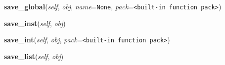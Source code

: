     \label{pickle:Pickler:save_global}

    \vspace{0.5ex}

\hspace{.8\funcindent}\begin{boxedminipage}{\funcwidth}

    \raggedright \textbf{save\_global}(\textit{self}, \textit{obj}, \textit{name}={\tt None}, \textit{pack}={\tt {\textless}built-in function pack{\textgreater}})

\setlength{\parskip}{2ex}
\setlength{\parskip}{1ex}
    \end{boxedminipage}

    \label{pickle:Pickler:save_inst}

    \vspace{0.5ex}

\hspace{.8\funcindent}\begin{boxedminipage}{\funcwidth}

    \raggedright \textbf{save\_inst}(\textit{self}, \textit{obj})

\setlength{\parskip}{2ex}
\setlength{\parskip}{1ex}
    \end{boxedminipage}

    \label{pickle:Pickler:save_int}

    \vspace{0.5ex}

\hspace{.8\funcindent}\begin{boxedminipage}{\funcwidth}

    \raggedright \textbf{save\_int}(\textit{self}, \textit{obj}, \textit{pack}={\tt {\textless}built-in function pack{\textgreater}})

\setlength{\parskip}{2ex}
\setlength{\parskip}{1ex}
    \end{boxedminipage}

    \label{pickle:Pickler:save_list}

    \vspace{0.5ex}

\hspace{.8\funcindent}\begin{boxedminipage}{\funcwidth}

    \raggedright \textbf{save\_list}(\textit{self}, \textit{obj})

\setlength{\parskip}{2ex}
\setlength{\parskip}{1ex}
    \end{boxedminipage}

